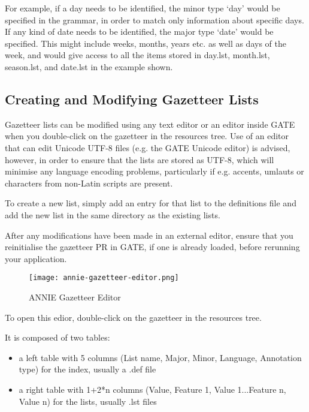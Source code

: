 For example, if a day needs to be identified, the minor
type `day' would be specified in the grammar, in order to match only
information about specific days. If any kind of date needs to be
identified, the major type `date' would be specified. This might
include weeks, months, years etc. as well as days of the week, and
would give access to all the items stored in day.lst, month.lst, season.lst,
and date.lst in the example shown.

\subsection{Creating and Modifying Gazetteer Lists}

Gazetteer lists can be modified using any text editor or an editor inside GATE
when you double-click on the gazetteer in the resources tree. Use of an
editor that can edit Unicode UTF-8 files (e.g. the GATE Unicode editor) is
advised, however, in order to ensure that the lists are stored as UTF-8,
which will minimise any language encoding problems, particularly if
e.g. accents, umlauts or characters from non-Latin scripts are present.

To create a new list, simply add an entry for that list to the
definitions file and add the new list in the same directory as the
existing lists. 

After any modifications have been made in an external editor, ensure that
you reinitialise the gazetteer PR in GATE, if one is already loaded, before
rerunning your application.


\begin{figure}[htbp]
\begin{center}
\texttt{[image: annie-gazetteer-editor.png]}
\end{center}
\caption{ANNIE Gazetteer Editor}
\label{fig:anniegazeditor}
\end{figure}

To open this edior, double-click on the
gazetteer in the resources tree.

It is composed of two tables:
\begin{itemize}
\item a left table with 5 columns (List name, Major, Minor, Language, Annotation type) for the
  index, usually a .def file
\item a right table with 1+2*n columns (Value, Feature 1, Value 1...Feature
n, Value n) for the lists, usually .lst files
\end{itemize}

